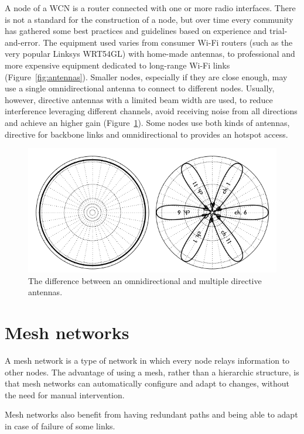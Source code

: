 \documentclass[a4paper,11pt,twoside,openright]{memoir}
\newcommand{\figref}[1] {Figure~\ref{#1}}
\begin{document}
A node of a WCN is a router connected with one or more radio interfaces.
There is not a standard for the construction of a node, but over time
every community has gathered some best practices and guidelines based on
experience and trial-and-error. The equipment used varies from consumer
Wi-Fi routers (such as the very popular Linksys WRT54GL) with home-made
antennas, to professional and more expensive equipment dedicated to
long-range Wi-Fi links (\figref{fig:antennas}). Smaller nodes, especially
if they are close enough,
may use a single omnidirectional antenna to connect to
different nodes. Usually, however, directive antennas with a limited
beam width are used, to reduce interference leveraging different
channels, avoid receiving noise from all directions and achieve an
higher gain (\figref{fig:omni_vs_dir}). Some nodes use both kinds of
antennas, directive for
backbone links and omnidirectional to provides an hotspot access.

\begin{figure}[htbp]
\centering
\includegraphics{./images/directional-antennas.png}
\caption{The difference between an omnidirectional and multiple
directive antennas.}
\label{fig:omni_vs_dir}
\end{figure}

\section{Mesh networks}\label{mesh-networks}
A mesh network is a type of network in which every node relays information
to other nodes. The advantage of using a mesh, rather than a
hierarchic structure, is that mesh networks can automatically configure
and adapt to changes, without the need for manual intervention.

Mesh networks also benefit from having redundant paths and being able to
adapt in case of failure of some links.
\end{document}
